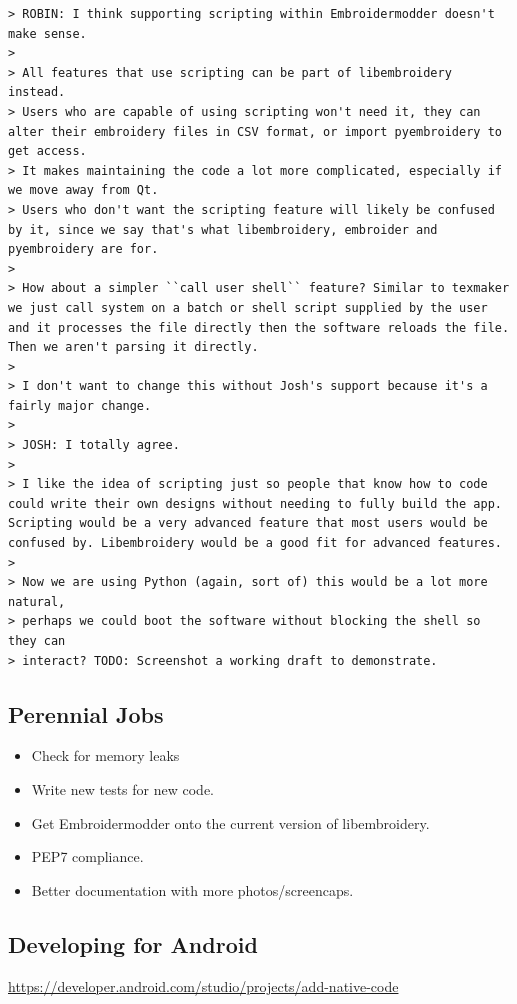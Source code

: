 \documentclass[a4paper]{report}
\begin{document}
\begin{verbatim}
> ROBIN: I think supporting scripting within Embroidermodder doesn't make sense.
> 
> All features that use scripting can be part of libembroidery instead.
> Users who are capable of using scripting won't need it, they can alter their embroidery files in CSV format, or import pyembroidery to get access.
> It makes maintaining the code a lot more complicated, especially if we move away from Qt.
> Users who don't want the scripting feature will likely be confused by it, since we say that's what libembroidery, embroider and pyembroidery are for.
> 
> How about a simpler ``call user shell`` feature? Similar to texmaker we just call system on a batch or shell script supplied by the user and it processes the file directly then the software reloads the file. Then we aren't parsing it directly.
> 
> I don't want to change this without Josh's support because it's a fairly major change.
>
> JOSH: I totally agree.
> 
> I like the idea of scripting just so people that know how to code could write their own designs without needing to fully build the app. Scripting would be a very advanced feature that most users would be confused by. Libembroidery would be a good fit for advanced features.
> 
> Now we are using Python (again, sort of) this would be a lot more natural,
> perhaps we could boot the software without blocking the shell so they can
> interact? TODO: Screenshot a working draft to demonstrate.
\end{verbatim}

\subsection{Perennial Jobs}

\begin{itemize}
\item Check for memory leaks
\item Write new tests for new code.
\item Get Embroidermodder onto the current version of libembroidery.
\item PEP7 compliance.
\item Better documentation with more photos/screencaps.
\end{itemize}

\subsection{Developing for Android}

\url{https://developer.android.com/studio/projects/add-native-code}
\end{document}
